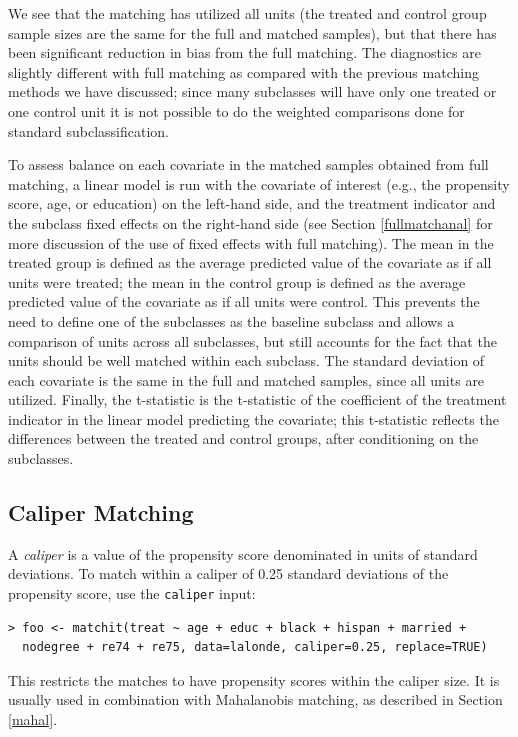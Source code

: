 \documentclass[oneside,letterpaper,titlepage]{article}
\begin{document}
We see that the matching has utilized all units (the treated and
control group sample sizes are the same for the full and matched
samples), but that there has been significant reduction in bias from
the full matching.  The diagnostics are slightly different with full
matching as compared with the previous matching methods we have
discussed; since many subclasses will have only one treated or one
control unit it is not possible to do the weighted comparisons done
for standard subclassification.

To assess balance on each covariate in the matched samples obtained
from full matching, a linear model is run with the covariate of
interest (e.g., the propensity score, age, or education) on the
left-hand side, and the treatment indicator and the subclass fixed
effects on the right-hand side (see Section \ref{fullmatchanal} for
more discussion of the use of fixed effects with full matching).  The
mean in the treated group is defined as the average predicted value of
the covariate as if all units were treated; the mean in the control
group is defined as the average predicted value of the covariate as if
all units were control.  This prevents the need to define one of the
subclasses as the baseline subclass and allows a comparison of units
across all subclasses, but still accounts for the fact that the units
should be well matched within each subclass.  The standard deviation
of each covariate is the same in the full and matched samples, since
all units are utilized.  Finally, the t-statistic is the t-statistic
of the coefficient of the treatment indicator in the linear model
predicting the covariate; this t-statistic reflects the differences
between the treated and control groups, after conditioning on the
subclasses.


\subsection{Caliper Matching}

A \emph{caliper} is a value of the propensity score denominated in
units of standard deviations.  To match within a caliper of 0.25
standard deviations of the propensity score, use the \texttt{caliper}
input:

\begin{verbatim}
> foo <- matchit(treat ~ age + educ + black + hispan + married +
  nodegree + re74 + re75, data=lalonde, caliper=0.25, replace=TRUE)
\end{verbatim}

This restricts the matches to have propensity scores within the
caliper size.  It is usually used in combination with Mahalanobis
matching, as described in Section \ref{mahal}.
\end{document}
